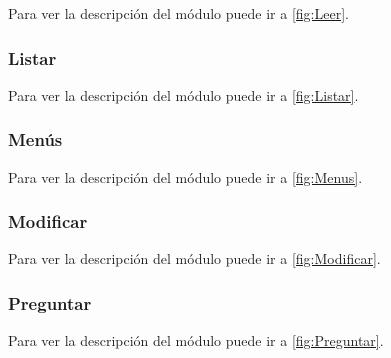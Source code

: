 Para ver la descripción del módulo puede ir a \ref{fig:Leer}.

\label{fig:LeerCod}


\subsubsection{Listar}

Para ver la descripción del módulo puede ir a \ref{fig:Listar}.

\label{fig:ListarCod}


\subsubsection{Menús}

Para ver la descripción del módulo puede ir a \ref{fig:Menus}.

\label{fig:MenusCod}


\subsubsection{Modificar}

Para ver la descripción del módulo puede ir a \ref{fig:Modificar}.

\label{fig:ModificarCod}


\subsubsection{Preguntar}

Para ver la descripción del módulo puede ir a \ref{fig:Preguntar}.

\label{fig:PreguntarCod}
